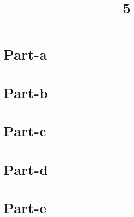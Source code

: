 \documentclass[a4paper]{article}
\title{5}
\date{}
\begin{document}
\maketitle
\section{Part-a}
\section{Part-b}
\section{Part-c}
\section{Part-d}
\section{Part-e}
\end{document}
